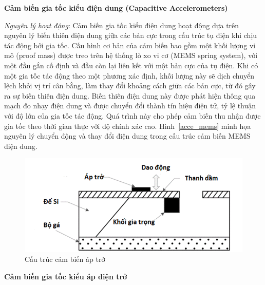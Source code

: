 \textbf{Cảm biến gia tốc kiểu điện dung (Capacitive Accelerometers)}


\textit{Nguyên lý hoạt động}: Cảm biến gia tốc kiểu điện dung hoạt động dựa trên nguyên lý biến thiên điện dung giữa các bản cực trong cấu trúc tụ điện khi chịu tác động bởi gia tốc. Cấu hình cơ bản của cảm biến bao gồm một khối lượng vi mô (proof mass) được treo trên hệ thống lò xo vi cơ (MEMS spring system), với một đầu gắn cố định và đầu còn lại liên kết với một bản cực của tụ điện. Khi có một gia tốc tác động theo một phương xác định, khối lượng này sẽ dịch chuyển lệch khỏi vị trí cân bằng, làm thay đổi khoảng cách giữa các bản cực, từ đó gây ra sự biến thiên điện dung. Biến thiên điện dung này được phát hiện thông qua mạch đo nhạy điện dung và được chuyển đổi thành tín hiệu điện tử, tỷ lệ thuận với độ lớn của gia tốc tác động. Quá trình này cho phép cảm biến thu nhận được gia tốc theo thời gian thực với độ chính xác cao. Hình~\ref{acce_mems} minh họa nguyên lý chuyển động và thay đổi điện dung trong cấu trúc cảm biến MEMS điện dung.



\begin{figure} [!]
		\centering
 		\includegraphics[width=\textwidth]{images/acce_aptro.png}
 		\vspace*{-7mm}
		\caption{Cấu trúc cảm biến áp trở}
		\label{acce_aptro}
  \FloatBarrier
\end{figure}
\textbf{Cảm biến gia tốc kiểu áp điện trở}

